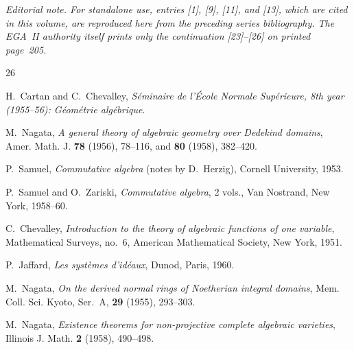 \clearpage
{}
{}
\renewcommand{\refname}{Bibliography}
\noindent\textit{Editorial note. For standalone use, entries [1], [9],
[11], and [13], which are cited in this volume, are reproduced here from
the preceding series bibliography. The EGA~II authority itself prints
only the continuation [23]--[26] on printed page~205.}
\par\medskip

\begin{thebibliography}{26}

H.~Cartan and C.~Chevalley,
\emph{Séminaire de l'École Normale Supérieure, 8th year (1955--56):
Géométrie algébrique}.

M.~Nagata,
\emph{A general theory of algebraic geometry over Dedekind domains},
Amer. Math. J. \textbf{78} (1956), 78--116, and \textbf{80} (1958),
382--420.

P.~Samuel,
\emph{Commutative algebra} (notes by D.~Herzig), Cornell University,
1953.

P.~Samuel and O.~Zariski,
\emph{Commutative algebra}, 2 vols., Van Nostrand, New York, 1958--60.

C.~Chevalley,
\emph{Introduction to the theory of algebraic functions of one variable},
Mathematical Surveys, no.~6, American Mathematical Society, New York,
1951.

P.~Jaffard,
\emph{Les systèmes d'idéaux}, Dunod, Paris, 1960.

M.~Nagata,
\emph{On the derived normal rings of Noetherian integral domains},
Mem. Coll. Sci. Kyoto, Ser.~A, \textbf{29} (1955), 293--303.

M.~Nagata,
\emph{Existence theorems for non-projective complete algebraic
varieties}, Illinois J. Math. \textbf{2} (1958), 490--498.

\end{thebibliography}
